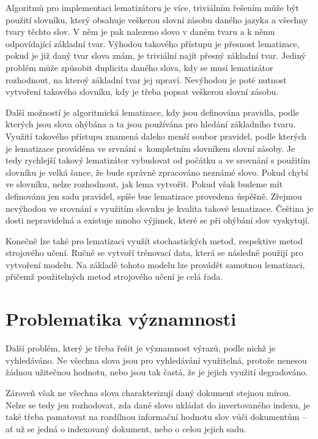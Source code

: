 \documentclass[FM,DP]{tulthesis}
\begin{document}
Algoritmů pro implementaci lematizátoru je více, triviálním řešením může být použití
slovníku, který obsahuje veškerou slovní zásobu daného jazyka a všechny tvary těchto
slov. V něm je pak nalezeno slovo v daném tvaru a k němu odpovídající základní tvar.
Výhodou takového přístupu je přesnost lematizace, pokud je již daný tvar slova znám, 
je triviální najít přesný základní tvar. Jediný problém může způsobit duplicita daného 
slova, kdy se musí lematizátor rozhodnout, na kteroý základní tvar jej upraví. Nevýhodou
je poté nutnost vytvoření takového slovníku, kdy je třeba popsat veškerou slovní zásobu.

Další možností je algoritmická lematizace, kdy jsou definována pravidla, podle kterých jsou
slova ohýbána a ta jsou používána pro hledání základního tvaru. Využití takového přístupu
znamená daleko menší soubor pravidel, podle kterých je lematizace prováděna ve srvnání 
s~kompletním slovníkem slovní zásoby. Je tedy rychlejší takový lematizátor vybudovat
od počátku a ve srovnání s použitím slovníku je velká šance, že bude správně zpracováno
neznámé slovo. Pokud chybí ve slovníku, nelze rozhodnout, jak lema vytvořit. Pokud
však budeme mít definovánu jen sadu pravidel, spíše bue lematizace provedena úspěšně.
Zřejmou nevýhodou ve srovnání s využitím slovnku je kvalita takové lematizace. 
Čeština je dosti nepravidelná a existuje mnoho výjimek, které se při ohýbání slov vyskytují.

Konečně lze také pro lematizaci využít stochastických metod, respektive metod strojového
učení. Ručně se vytvoří trénovací data, která se následně použijí pro vytvoření modelu.
Na základě tohoto modelu lze provádět samotnou lematizaci, přičemž použitelných metod 
strojového učení je celá řada.

\section{Problematika významnosti}

Další problém, který je třeba řešit je významnost výrazů, podle nichž je vyhledáváno.
Ne všechna slova jsou pro vyhledávání využitelná, protože nenesou žádnou užitečnou 
hodnotu, nebo jsou tak častá, že je jejich využití degradováno. 

Zároveň však ne všechna slova charakterizují daný dokument stejnou mírou. Nelze se tedy 
jen rozhodovat, zda dané slovo ukládat do invertovaného indexu, je také třeba pamatovat
na rozdílnou informační hodnotu slov vůči dokumentům -- ať už se jedná o indexovaný
dokument, nebo o celou jejich sadu.
\end{document}
